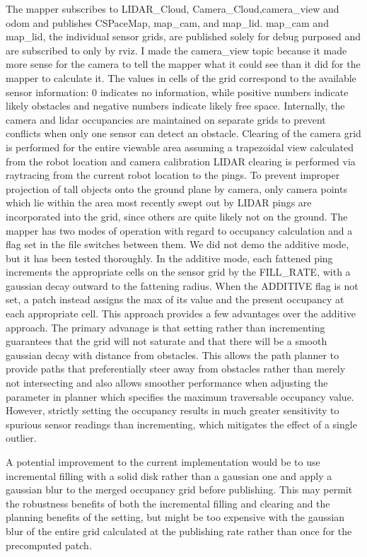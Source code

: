 \documentclass{article}
\begin{document}
The mapper subscribes to LIDAR_Cloud, Camera_Cloud,camera_view and odom and publishes CSPaceMap, map_cam, and map_lid.  
map_cam and map_lid, the individual sensor grids, are published solely for debug purposed and are subscribed to only by rviz.
I made the camera_view topic because it made more sense for the camera to tell the mapper what it could see than it did for the mapper to calculate it.
The values in cells of the grid correspond to the available sensor information: 0 indicates no information, while positive numbers indicate likely obstacles and negative numbers indicate likely free space.
Internally, the camera and lidar occupancies are maintained on separate grids to prevent conflicts when only one sensor can detect an obstacle.
Clearing of the camera grid is performed for the entire viewable area assuming a trapezoidal view calculated from the robot location and camera calibration
LIDAR clearing is performed via raytracing from the current robot location to the pings.
To prevent improper projection of tall objects onto the ground plane by camera, only camera points which lie within the area most recently swept out by LIDAR pings are incorporated into the grid, since others are quite likely not on the ground.
The mapper has two modes of operation with regard to occupancy calculation and a flag set in the file switches between them.
We did not demo the additive mode, but it has been tested thoroughly.  
In the additive mode, each fattened ping increments the appropriate cells on the sensor grid by the FILL_RATE, with a gaussian decay outward to the fattening radius.  
When the ADDITIVE flag is not set, a patch instead assigns the max of its value and the present occupancy at each appropriate cell.  
This approach provides a few advantages over the additive approach.  
The primary advanage is that setting rather than incrementing guarantees that the grid will not saturate and that there will be a smooth gaussian decay with distance from obstacles.  
This allows the path planner to provide paths that preferentially steer away from obstacles rather than merely not intersecting and also allows smoother performance when adjusting the parameter in planner which specifies the maximum traversable occupancy value.  
However, strictly setting the occupancy results in much greater sensitivity to spurious sensor readings than incrementing, which mitigates the effect of a single outlier.

A potential improvement to the current implementation would be to use incremental filling with a solid disk rather than a gaussian one and apply a gaussian blur to the merged occupancy grid before publishing.  
This may permit the robustness benefits of both the incremental filling and clearing and the planning benefits of the setting, but might be too expensive with the gaussian blur of the entire grid calculated at the publishing rate rather than once for the precomputed patch.
\end{document}
